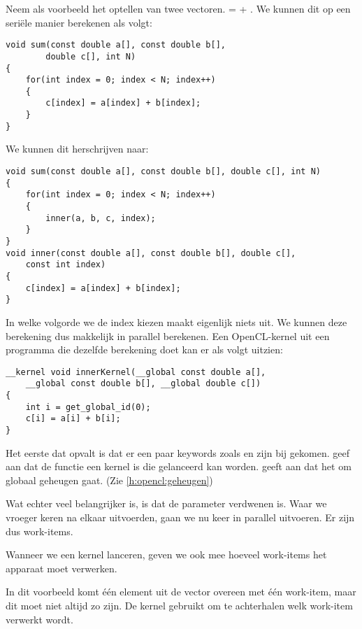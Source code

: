 Neem als voorbeeld het optellen van twee vectoren.  =  + . We kunnen dit op een seri\"ele manier berekenen als volgt:
\lstset{language=C, basicstyle=\footnotesize\ttfamily, keepspaces=true}
\begin{lstlisting}
void sum(const double a[], const double b[],
        double c[], int N)
{
    for(int index = 0; index < N; index++)
    {
        c[index] = a[index] + b[index];
    }
}
\end{lstlisting}
We kunnen dit herschrijven naar:
\begin{lstlisting}
void sum(const double a[], const double b[], double c[], int N)
{
    for(int index = 0; index < N; index++)
    {
        inner(a, b, c, index);
    }
}
void inner(const double a[], const double b[], double c[],
    const int index)
{
    c[index] = a[index] + b[index];
}
\end{lstlisting}
In welke volgorde we de index kiezen maakt eigenlijk niets uit. We kunnen deze berekening dus makkelijk in parallel berekenen.
Een OpenCL-kernel uit een programma die dezelfde berekening doet kan er als volgt uitzien:
\begin{lstlisting}
__kernel void innerKernel(__global const double a[],
    __global const double b[], __global double c[])
{
	int i = get_global_id(0);
	c[i] = a[i] + b[i];
}
\end{lstlisting}
Het eerste dat opvalt is dat er een paar keywords zoals  en  zijn bij gekomen.  geef aan dat de functie een kernel is die gelanceerd kan worden.  geeft aan dat het om globaal geheugen gaat. (Zie \ref{h:opencl:geheugen})

Wat echter veel belangrijker is, is dat de parameter  verdwenen is. Waar we vroeger   keren na elkaar uitvoerden, gaan we nu   keer in parallel uitvoeren. Er zijn dus  work-items. 

Wanneer we een kernel lanceren, geven we ook mee hoeveel work-items het apparaat moet verwerken.

In dit voorbeeld komt \'e\'en element uit de vector overeen met \'e\'en work-item, maar dit moet niet altijd zo zijn. De kernel gebruikt  om te achterhalen welk work-item verwerkt wordt.



